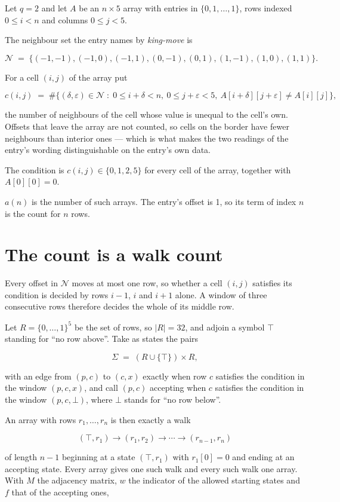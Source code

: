 \documentclass[11pt]{article}
\theoremstyle{definition}
\begin{document}
Let $q = 2$ and let $A$ be an $n \times 5$ array with entries in $\{0,1,\dots,1\}$, rows indexed $0 \le i < n$ and columns $0 \le j < 5$.

The neighbour set the entry names by {\itshape king-move} is

\[\mathcal{N} \;=\; \{(-1,-1), (-1,0), (-1,1), (0,-1), (0,1), (1,-1), (1,0), (1,1)\}.\]

For a cell $(i,j)$ of the array put

\[c(i,j) \;=\; \#\bigl\{(\delta,\varepsilon)\in\mathcal{N} \;:\; 0\le i+\delta<n,\ 0\le j+\varepsilon<5,\ A[i+\delta][j+\varepsilon] \neq A[i][j]\bigr\},\]

the number of neighbours of the cell whose value is unequal to the cell's own. Offsets that leave the array are not counted, so cells on the border have fewer neighbours than interior ones --- which is what makes the two readings of the entry's wording distinguishable on the entry's own data.

The condition is $c(i,j) \in \{0, 1, 2, 5\}$ for every cell of the array, together with $A[0][0]=0$.

$a(n)$ is the number of such arrays. The entry's offset is 1, so its term of index $n$ is the count for $n$ rows.

\section{The count is a walk count}

Every offset in $\mathcal{N}$ moves at most one row, so whether a cell $(i,j)$ satisfies its condition is decided by rows $i-1$, $i$ and $i+1$ alone. A window of three consecutive rows therefore decides the whole of its middle row.

Let $R = \{0,\dots,1\}^{5}$ be the set of rows, so $|R| = 32$, and adjoin a symbol $\top$ standing for ``no row above''. Take as states the pairs

\[\Sigma \;=\; (R \cup \{\top\}) \times R,\]

with an edge from $(p,c)$ to $(c,x)$ exactly when row $c$ satisfies the condition in the window $(p,c,x)$, and call $(p,c)$ accepting when $c$ satisfies the condition in the window $(p,c,\bot)$, where $\bot$ stands for ``no row below''.

An array with rows $r_1,\dots,r_n$ is then exactly a walk

\[(\top,r_1) \to (r_1,r_2) \to \cdots \to (r_{n-1},r_n)\]

of length $n-1$ beginning at a state $(\top,r_1)$ with $r_1[0]=0$ and ending at an accepting state. Every array gives one such walk and every such walk one array. With $M$ the adjacency matrix, $w$ the indicator of the allowed starting states and $f$ that of the accepting ones,
\end{document}
